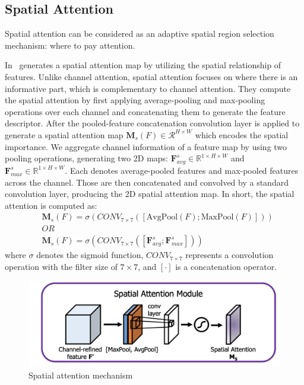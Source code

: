 \subsection{Spatial Attention}
Spatial attention can be considered as an adaptive spatial region selection mechanism: where to pay attention.

In~\cite{woo2018cbam} generates a spatial attention map by utilizing the spatial relationship of features. Unlike channel attention, spatial attention focuses on where there is an informative part, which is complementary to channel attention. They compute the spatial attention by first applying average-pooling and max-pooling operations over each channel and concatenating them to generate the feature descriptor. After the pooled-feature concatenation convolution layer is applied to generate a spatial attention map $\textbf{M}_{s}\left(F\right) \in \mathcal{R}^{H×W}$ which encodes the spatial importance.
We aggregate channel information of a feature map by using two pooling operations, generating two 2D maps:
$\mathbf{F}^{s}_{avg} \in \mathbb{R}^{1\times{H}\times{W}}$
and $\mathbf{F}^{s}_{max} \in \mathbb{R}^{1\times{H}\times{W}}$. Each denotes average-pooled features and max-pooled features across the channel. Those are then concatenated and convolved by a standard convolution layer, producing the 2D spatial attention map. In short, the spatial attention is computed as:
\begin{equation}\begin{split}
    &\textbf{M}_{s}\left(F\right) = \sigma\left(CONV_{7\times7}\left(\left[\text{AvgPool}\left(F\right);\text{MaxPool}\left(F\right)\right]\right)\right) \\
    &OR\\
    & \textbf{M}_{s}\left(F\right) = \sigma\left(CONV_{7\times7}\left(\left[\mathbf{F}^{s}_{avg};\mathbf{F}^{s}_{max} \right]\right)\right) 
\end{split}\end{equation}
where $\sigma$ denotes the sigmoid function,  $CONV_{7\times7}$ represents a convolution operation with the filter size of $7\times7$, and $[\cdot]$ is a concatenation operator.
\begin{figure}
    \begin{center}
        \includegraphics[width=\textwidth]{Figures/SpatialAttentionExample.png}
        \caption{\label{fig:spattex} Spatial attention mechanism }
    \end{center}
\end{figure}

